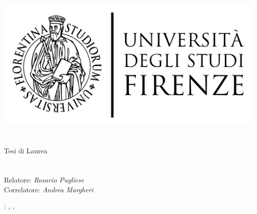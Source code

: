 \begin{titlepage}
	\begin{center}
   	\large
      \hfill
      \vfill
      \begingroup
         \includegraphics[scale=0.15]{logo/LOGO}\\
			\myFaculty \\
			\myDegree \\
			\vspace{0.5cm}
         \vspace{0.5cm}
         Tesi di Laurea
      \endgroup
      \vfill
      \begingroup
      	\color{Maroon}\spacedallcaps{\myItalianTitle} \\ $\ $\\
      	\spacedallcaps{\myEnglishTitle} \\
	\bigskip
      \endgroup
      \spacedlowsmallcaps{\myName}
      \vfill
      \vfill
      Relatore: \emph{Rosario Pugliese}\\
      Correlatore: \emph{Andrea Margheri}\\
      \vfill
      \vfill
      \myTime
      \vfill
	\end{center}
\end{titlepage}
   \newpage
	\thispagestyle{empty}
	\hfill
	\vfill
	\noindent\myName:
	\textit{\myItalianTitle,}
	\myDegree, \textcopyright\ \myTime
